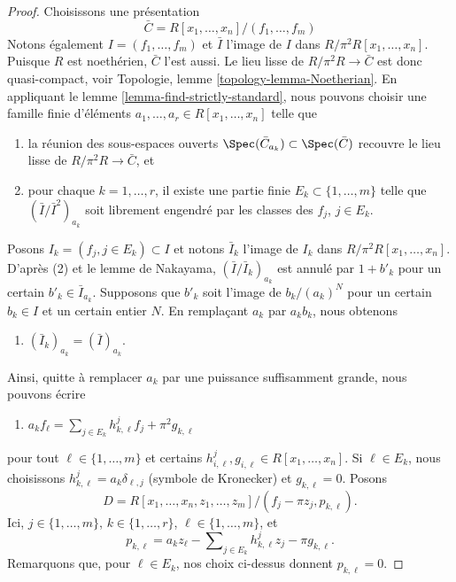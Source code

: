 \begin{proof}
Choisissons une présentation
$$
\bar C = R[x_1, \ldots, x_n]/(f_1, \ldots, f_m)
$$
Notons également $I = (f_1, \ldots, f_m)$ et $\bar I$ l'image de
$I$ dans $R/\pi^2R[x_1, \ldots, x_n]$. Puisque $R$ est noethérien,
$\bar C$ l'est aussi. Le lieu lisse de $R/\pi^2 R \to \bar C$
est donc quasi-compact, voir
Topologie, lemme \ref{topology-lemma-Noetherian}.
En appliquant le
lemme \ref{lemma-find-strictly-standard},
nous pouvons choisir une famille finie d'éléments
$a_1, \ldots, a_r \in R[x_1, \ldots, x_n]$ telle que
\begin{enumerate}
\item la réunion des sous-espaces ouverts
$\Spec(\bar C_{a_k}) \subset \Spec(\bar C)$
recouvre le lieu lisse de $R/\pi^2 R \to \bar C$, et
\item pour chaque $k = 1, \ldots, r$, il existe une partie finie
$E_k \subset \{1, \ldots, m\}$ telle que
$(\bar I/\bar I^2)_{a_k}$ soit librement engendré par les classes des
$f_j$, $j \in E_k$.
\end{enumerate}
Posons $I_k = (f_j, j \in E_k) \subset I$ et notons $\bar I_k$
l'image de $I_k$ dans $R/\pi^2R[x_1, \ldots, x_n]$.
D'après (2) et le lemme de Nakayama, $(\bar I/\bar I_k)_{a_k}$
est annulé par $1 + b'_k$ pour un certain $b'_k \in \bar I_{a_k}$.
Supposons que $b'_k$ soit l'image de $b_k/(a_k)^N$ pour un certain $b_k \in I$
et un certain entier $N$. En remplaçant $a_k$ par $a_kb_k$, nous obtenons
\begin{enumerate}
\item[(3)] $(\bar I_k)_{a_k} = (\bar I)_{a_k}$.
\end{enumerate}
Ainsi, quitte à remplacer $a_k$ par une puissance suffisamment grande, nous pouvons écrire
\begin{enumerate}
\item[(4)]
$a_k f_\ell = \sum\nolimits_{j \in E_k} h_{k, \ell}^jf_j + \pi^2 g_{k, \ell}$
\end{enumerate}
pour tout $\ell \in \{1, \ldots, m\}$ et certains
$h_{i, \ell}^j, g_{i, \ell} \in R[x_1, \ldots, x_n]$.
Si $\ell \in E_k$, nous choisissons $h_{k, \ell}^j = a_k\delta_{\ell, j}$
(symbole de Kronecker) et $g_{k, \ell} = 0$. Posons
$$
D = R[x_1, \ldots, x_n, z_1, \ldots, z_m]/
(f_j - \pi z_j, p_{k, \ell}).
$$
Ici, $j \in \{1, \ldots, m\}$, $k \in \{1, \ldots, r\}$,
$\ell \in \{1, \ldots, m\}$, et
$$
p_{k, \ell} = a_k z_\ell - \sum\nolimits_{j \in E_k} h_{k, \ell}^j z_j
- \pi g_{k, \ell}.
$$
Remarquons que, pour $\ell \in E_k$, nos choix ci-dessus donnent $p_{k, \ell} = 0$.


\end{proof}
